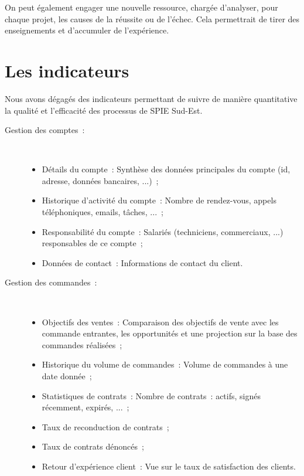     On peut également engager une nouvelle ressource, chargée d'analyser, pour chaque projet, les causes de la réussite ou de l'échec. Cela permettrait de tirer des enseignements et d'accumuler de l'expérience.


\section{Les indicateurs}

    Nous avons dégagés des indicateurs permettant de suivre de manière quantitative la qualité et l'efficacité des processus de SPIE Sud-Est.

    \begin{description}
        \item[Gestion des comptes~:] ~ \\
            \begin{itemize}
                \item Détails du compte~: Synthèse des données principales du compte (id, adresse, données bancaires, ...)~;
                \item Historique d'activité du compte~: Nombre de rendez-vous, appels téléphoniques, emails, tâches, ...~;
                \item Responsabilité du compte~: Salariés (techniciens, commerciaux, ...) responsables de ce compte~;
                \item Données de contact~: Informations de contact du client.
            \end{itemize}

        \item[Gestion des commandes~:] ~ \\
            \begin{itemize}
                \item Objectifs des ventes~: Comparaison des objectifs de vente avec les commande entrantes, les opportunités et une projection sur la base des commandes réalisées~;
                \item Historique du volume de commandes~: Volume de commandes à une date donnée~;
                \item Statistiques de contrats~: Nombre de contrats~: actifs, signés récemment, expirés, ...~;
                \item Taux de reconduction de contrats~;
                \item Taux de contrats dénoncés~;
                \item Retour d'expérience client~: Vue sur le taux de satisfaction des clients.
            \end{itemize}


\end{description}
